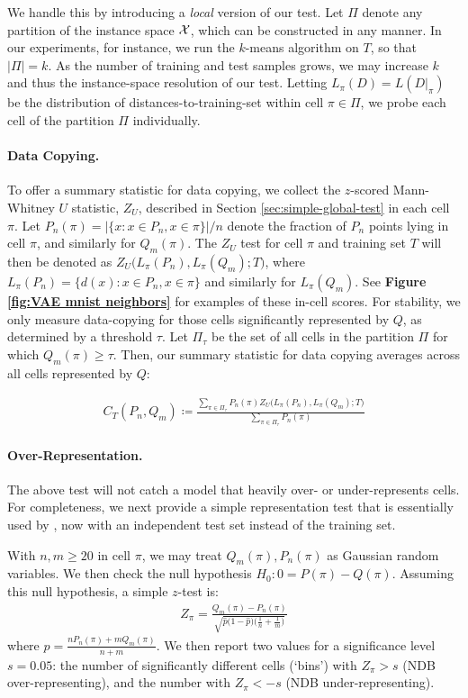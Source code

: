 We handle this by introducing a {\it local} version of our test. Let $\Pi$ denote any partition of the instance space $\mathcal{X}$, which can be constructed in any manner. In our experiments, for instance, we run the $k$-means algorithm on $T$, so that $|\Pi| = k$. As the number of training and test samples grows, we may increase $k$ and thus the instance-space resolution of our test. Letting $L_\pi(D) = L(D|_{\pi})$ be the distribution of distances-to-training-set within cell $\pi \in \Pi$, we probe each cell of the partition $\Pi$ individually. 

\paragraph{Data Copying.}
\label{sec:data copying statistic}
To offer a summary statistic for data copying, we collect the $z$-scored Mann-Whitney $U$ statistic, $Z_U$, described in Section \ref{sec:simple-global-test} in each cell $\pi$. Let $P_n(\pi) = |\{x: x \in P_n, x \in \pi\}| / n$ denote the fraction of $P_n$ points lying in cell $\pi$, and similarly for $Q_m(\pi)$. The $Z_U$ test for cell $\pi$ and training set $T$ will then be denoted as $Z_U\big(L_\pi(P_n), L_\pi(Q_m); T\big)$, where $L_\pi(P_n) = \{d(x): x \in P_n, x \in \pi\}$ and similarly for $L_\pi(Q_m)$. See \textbf{Figure \ref{fig:VAE mnist neighbors}} for examples of these in-cell scores. For stability, we only measure data-copying for those cells significantly represented by $Q$, as determined by a threshold $\tau$. Let $\Pi_{\tau}$ be the set of all cells in the partition $\Pi$ for which $Q_m(\pi) \geq \tau$. Then, our summary statistic for data copying averages across all cells represented by $Q$:  

\begin{align*}
    C_T(P_n, Q_m) \coloneqq  \frac{\sum_{\pi \in \Pi_\tau} P_n(\pi) Z_U\big(L_\pi(P_n), L_\pi(Q_m); T\big)}{ \sum_{\pi \in \Pi_\tau} P_n(\pi) }
\end{align*}

\paragraph{Over-Representation.}
\label{sec:over rep statistic}
The above test will not catch a model that heavily over- or under-represents cells. For completeness, we next provide a simple representation test that is essentially used by \cite{richardson}, now with an independent test set instead of the training set.  

With $n, m\geq 20$ in cell $\pi$, we may treat $Q_m(\pi), P_n(\pi)$ as Gaussian random variables. We then check the null hypothesis $H_0 : 0 = P(\pi) - Q(\pi)$. Assuming this null hypothesis, a simple $z$-test is: 
\begin{align*}
Z_\pi = \frac{Q_m(\pi) - P_n(\pi)}
 {\sqrt{ \widehat{p}\big(1 - \widehat{p}\big) \big( \frac{1}{n} + \frac{1}{m} \big) }}
\end{align*}
where $\widehat{p} = \frac{nP_n(\pi) + mQ_m(\pi)}{n + m}$. We then report two values for a significance level $s = 0.05$: the number of significantly different cells (`bins') with $Z_\pi > s$ (NDB over-representing), and the number with $Z_\pi < -s$ (NDB under-representing).

